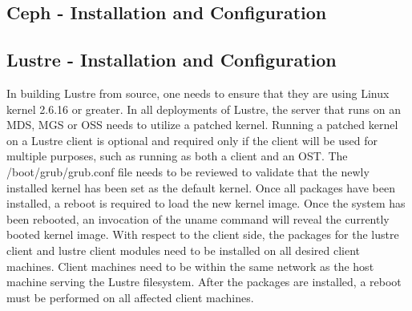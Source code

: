 \documentclass[11pt]{article}
\begin{document}
\subsection{Ceph - Installation and Configuration}


\subsection{Lustre - Installation and Configuration}
In building Lustre from source, one needs to ensure that they are using 
Linux kernel 2.6.16 or greater. In all deployments of Lustre, the server 
that runs on an MDS, MGS or OSS needs to utilize a patched kernel. 
Running a patched kernel on a Lustre client is optional and required only 
if the client will be used for multiple purposes, such as running as both 
a client and an OST. The /boot/grub/grub.conf file needs to be reviewed 
to validate that the newly installed kernel has been set as the default 
kernel. Once all packages have been installed, a reboot is required to 
load the new kernel image. Once the system has been rebooted, an invocation 
of the uname command will reveal the currently booted kernel image. With 
respect to the client side, the packages for the lustre client and lustre 
client modules need to be installed on all desired client machines. Client 
machines need to be within the same network as the host machine serving the 
Lustre filesystem. After the packages are installed, a reboot must be 
performed on all affected client machines.
\end{document}

